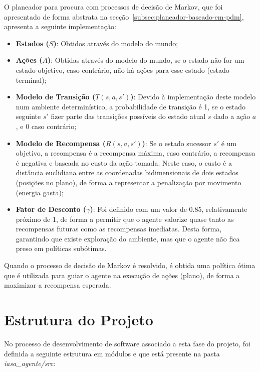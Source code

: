 O planeador para procura com processos de decisão de Markov, que foi apresentado de forma abstrata na secção~\ref{subsec:planeador-baseado-em-pdm},
apresenta a seguinte implementação:

\begin{itemize}
    \item \textbf{Estados (\(S\))}: Obtidos através do modelo do mundo;
    \item \textbf{Ações (\(A\))}: Obtidas através do modelo do mundo, se o estado não for um estado objetivo, caso contrário, não há ações para esse estado (estado terminal);
    \item \textbf{Modelo de Transição (\(T(s, a, s')\))}: Devido à implementação deste modelo num ambiente determinístico, a probabilidade de transição é 1, se o estado seguinte \(s'\) fizer parte das transições possíveis do estado atual \(s\) dado a ação \(a\), e 0 caso contrário;
    \item \textbf{Modelo de Recompensa (\(R(s, a, s')\))}: Se o estado sucessor \(s'\) é um objetivo, a recompensa é a recompensa máxima, caso contrário, a recompensa é negativa e baseada no custo da ação tomada.
    Neste caso, o custo é a distância euclidiana entre as coordenadas bidimensionais de dois estados (posições no plano), de forma a representar a penalização por movimento (energia gasta);
    \item \textbf{Fator de Desconto (\(\gamma\))}: Foi definido com um valor de 0.85, relativamente próximo de 1, de
    forma a permitir que o agente valorize quase tanto as recompensas futuras como as recompensas imediatas.
    Desta forma, garantindo que existe exploração do ambiente, mas que o agente não fica preso em políticas subótimas.
\end{itemize}

Quando o processo de decisão de Markov é resolvido, é obtida uma política ótima que é utilizada para guiar o agente na execução de ações (plano), de forma a maximizar a recompensa esperada.


\section{Estrutura do Projeto}\label{sec:estrutura-do-projeto-4}

No processo de desenvolvimento de software associado a esta fase do projeto, foi definida a seguinte estrutura em módulos e que está presente na pasta \textit{iasa\_agente/src}:


